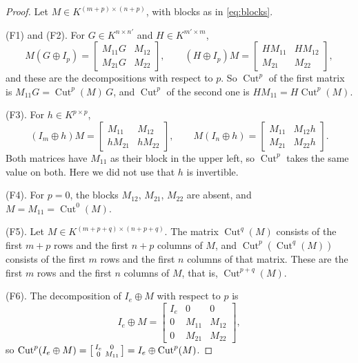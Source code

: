\documentclass[11pt,a4paper]{article}
\theoremstyle{plain}
\theoremstyle{definition}
\theoremstyle{remark}
\DeclareMathOperator{\Cut}{Cut}
\begin{document}
\begin{proof}
    Let $M \in K^{(m+p) \times (n+p)}$, with blocks as in \cref{eq:blocks}.

    (F1) and (F2).
    For $G \in K^{n \times n'}$ and $H \in K^{m' \times m}$,
    \begin{equation*}
        M (G \oplus I_p) = \begin{bmatrix} M_{11} G & M_{12} \\ M_{21} G & M_{22} \end{bmatrix},
        \qquad
        (H \oplus I_p) M = \begin{bmatrix} H M_{11} & H M_{12} \\ M_{21} & M_{22} \end{bmatrix},
    \end{equation*}
    and these are the decompositions with respect to $p$.
    So $\Cut^p$ of the first matrix is $M_{11} G = \Cut^p(M)\, G$, and $\Cut^p$ of the second one is $H M_{11} = H \Cut^p(M)$.

    (F3).
    For $h \in K^{p \times p}$,
    \begin{equation*}
        (I_m \oplus h) M = \begin{bmatrix} M_{11} & M_{12} \\ h M_{21} & h M_{22} \end{bmatrix},
        \qquad
        M (I_n \oplus h) = \begin{bmatrix} M_{11} & M_{12} h \\ M_{21} & M_{22} h \end{bmatrix} .
    \end{equation*}
    Both matrices have $M_{11}$ as their block in the upper left, so $\Cut^p$ takes the same value on both.
    Here we did not use that $h$ is invertible.

    (F4).
    For $p = 0$, the blocks $M_{12}$, $M_{21}$, $M_{22}$ are absent, and $M = M_{11} = \Cut^0(M)$.

    (F5).
    Let $M \in K^{(m+p+q) \times (n+p+q)}$.
    The matrix $\Cut^q(M)$ consists of the first $m+p$ rows and the first $n+p$ columns of $M$, and $\Cut^p(\Cut^q(M))$ consists of the first $m$ rows and the first $n$ columns of that matrix.
    These are the first $m$ rows and the first $n$ columns of $M$, that is, $\Cut^{p+q}(M)$.

    (F6).
    The decomposition of $I_e \oplus M$ with respect to $p$ is
    \begin{equation*}
        I_e \oplus M =
        \left[\begin{array}{cc|c}
                I_e & 0      & 0      \\
                0   & M_{11} & M_{12} \\ \hline
                0   & M_{21} & M_{22}
            \end{array}\right],
    \end{equation*}
    so $\Cut^p(I_e \oplus M) = \begin{bsmallmatrix} I_e & 0 \\ 0 & M_{11} \end{bsmallmatrix} = I_e \oplus \Cut^p(M)$.
\end{proof}
\end{document}
